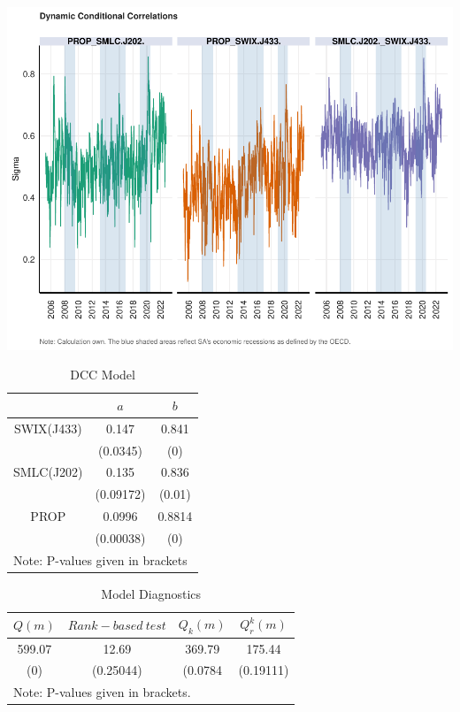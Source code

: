 \documentclass[11pt,preprint, authoryear]{elsarticle}
\let\origfigure\figure
\let\endorigfigure\endfigure
\renewenvironment{figure}[1][2] {
    \expandafter\origfigure\expandafter[H]
} {
    \endorigfigure
}
\numberwithin{equation}{section}
\numberwithin{figure}{section}
\numberwithin{table}{section}
\begin{document}
\begin{figure}[H]

{\centering \includegraphics{19025831_files/figure-latex/Figure3-1} 

}

\caption{DCC GARCH: Dynamic Conditional Correlations \label{Figure3}}\label{fig:Figure3}
\end{figure}

\begin{center}
\begin{longtable}{|ccc|}
\caption{DCC Model \label{DCC}} \\
\hline
\multicolumn{1}{|c}{}& 
\multicolumn{1}{c}{$a$}& 
\multicolumn{1}{c|}{$b$}\\
\hline \hline
\endhead
SWIX(J433)  & 0.147 & 0.841 \\ 
            & (0.0345) & (0)\\
SMLC(J202)  & 0.135 & 0.836 \\ 
            & (0.09172) & (0.01)\\
PROP        & 0.0996 & 0.8814 \\ 
            & (0.00038) & (0)\\
\hline
\multicolumn{3}{|l|}{Note: P-values given in brackets}\\
\hline
\end{longtable}
\end{center}

\begin{center}
\begin{longtable}{|cccc|}
\caption{Model Diagnostics \label{MARCH}} \\
\hline
\multicolumn{1}{c}{$Q(m)$}& 
\multicolumn{1}{c}{$Rank-based \ test$}& 
\multicolumn{1}{c}{$Q_k(m)$}&
\multicolumn{1}{c|}{$Q_r^{k} (m)$}\\
\hline \hline
\endhead
599.07  & 12.69 & 369.79 & 175.44\\ 
(0)    & (0.25044) & (0.0784 & (0.19111)\\
\hline
\multicolumn{4}{|l|}{Note: P-values given in brackets.}\\
\hline
\end{longtable}
\end{center}
\end{document}
